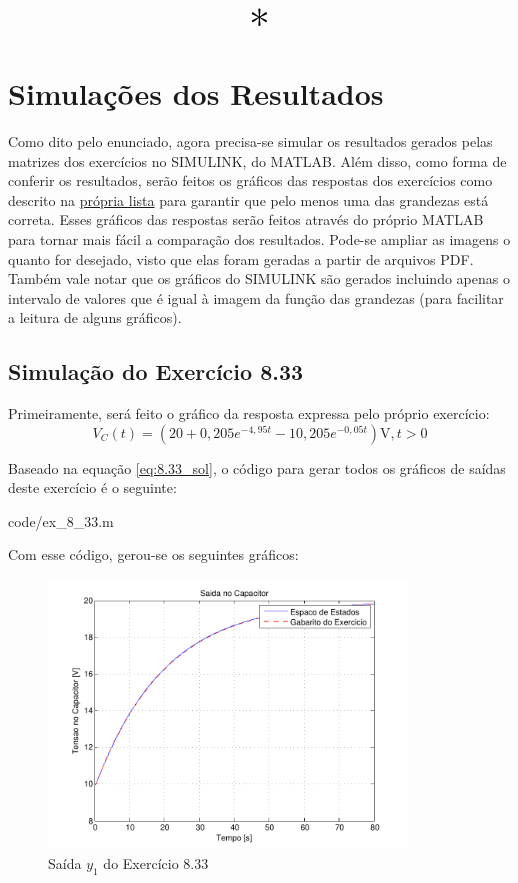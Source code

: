 \documentclass{report}
\let\oldsection\section
\renewcommand\section{\clearpage\oldsection}
\begin{document}
\begin{center}
      \[ \scalebox{3}{$ * $} \]
\end{center}

\section{Simulações dos Resultados}
Como dito pelo enunciado, agora precisa-se simular os resultados gerados pelas matrizes dos exercícios no SIMULINK, do MATLAB. Além disso, como forma de conferir os resultados,
serão feitos os gráficos das respostas dos exercícios como descrito na \href{https://www.ece.ufrgs.br/~fetter/eng10001/listas/circuitos_2a_ordem.pdf}{própria lista} para garantir que pelo menos uma das grandezas está correta. Esses gráficos das respostas
serão feitos através do próprio MATLAB para tornar mais fácil a comparação dos resultados. Pode-se ampliar as imagens o quanto for desejado, visto que elas foram geradas a partir de arquivos PDF. Também vale notar que os gráficos do SIMULINK são gerados
incluindo apenas o intervalo de valores que é igual à imagem da função das grandezas (para facilitar a leitura de alguns gráficos).

\subsection{Simulação do Exercício 8.33}
Primeiramente, será feito o gráfico da resposta expressa pelo próprio exercício:
$$ V_C(t) = \left(20 + 0,\!205e^{-4,95t} - 10,\!205e^{-0,05t}\right)\text{V}, t > 0 $$

Baseado na equação \ref{eq:8.33_sol}, o código para gerar todos os gráficos de saídas deste exercício é o seguinte:

                {code/ex_8_33.m}

Com esse código, gerou-se os seguintes gráficos:
\begin{figure}[h!]
    \centering
    \includegraphics[width=0.85\textwidth]{images/plots/plot_8_33_y1.pdf}
    \caption{\label{plot:8.33_y1} Saída $ y_1 $ do Exercício 8.33}
\end{figure}
\end{document}
